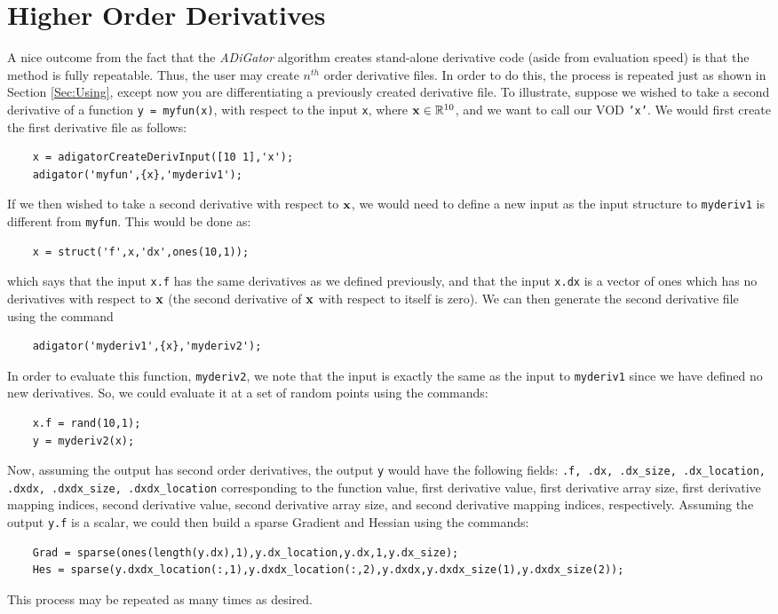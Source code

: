 \documentclass[10pt,pdftex]{article}
\begin{document}
\section{Higher Order Derivatives}
A nice outcome from the fact that the \emph{ADiGator} algorithm creates stand-alone derivative code (aside from evaluation speed) is that the method is fully repeatable. Thus, the user may create $n^{th}$ order derivative files. In order to do this, the process is repeated just as shown in Section \ref{Sec:Using}, except now you are differentiating a previously created derivative file. To illustrate, suppose we wished to take a second derivative of a function \texttt{y = myfun(x)}, with respect to the input \texttt{x}, where $\mathbf{x} \in \mathbb{R}^{10}$, and we want to call our VOD \texttt{'x'}. We would first create the first derivative file as follows:
\begin{verbatim}
    x = adigatorCreateDerivInput([10 1],'x');
    adigator('myfun',{x},'myderiv1');
\end{verbatim}
If we then wished to take a second derivative with respect to $\mathbf{x}$, we would need to define a new input as the input structure to \texttt{myderiv1} is different from \texttt{myfun}. This would be done as:
\begin{verbatim}
    x = struct('f',x,'dx',ones(10,1));
\end{verbatim}
which says that the input \texttt{x.f} has the same derivatives as we defined previously, and that the input \texttt{x.dx} is a vector of ones which has no derivatives with respect to $\mathbf{x}$ (the second derivative of $\mathbf{x}$ with respect to itself is zero). We can then generate the second derivative file using the command
\begin{verbatim}
    adigator('myderiv1',{x},'myderiv2');
\end{verbatim}
In order to evaluate this function, \texttt{myderiv2}, we note that the input is exactly the same as the input to \texttt{myderiv1} since we have defined no new derivatives. So, we could evaluate it at a set of random points using the commands:
\begin{verbatim}
    x.f = rand(10,1);
    y = myderiv2(x);
\end{verbatim}
Now, assuming the output has second order derivatives, the output \texttt{y} would have the following fields: \texttt{.f, .dx, .dx\_size, .dx\_location, .dxdx, .dxdx\_size, .dxdx\_location} corresponding to the function value, first derivative value, first derivative array size, first derivative mapping indices, second derivative value, second derivative array size, and second derivative mapping indices, respectively. Assuming the output \texttt{y.f} is a scalar, we could then build a sparse Gradient and Hessian using the commands:
\begin{verbatim}
    Grad = sparse(ones(length(y.dx),1),y.dx_location,y.dx,1,y.dx_size);
    Hes = sparse(y.dxdx_location(:,1),y.dxdx_location(:,2),y.dxdx,y.dxdx_size(1),y.dxdx_size(2));
\end{verbatim}
This process may be repeated as many times as desired.
\end{document}
